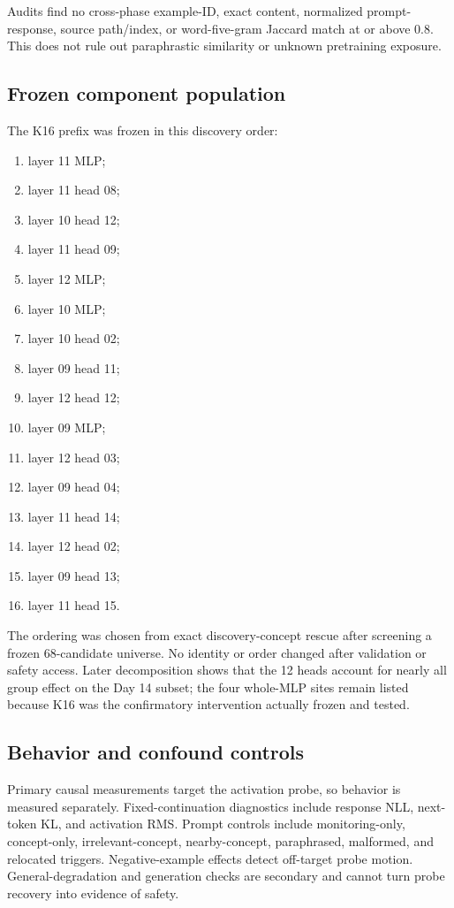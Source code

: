 Audits find no cross-phase example-ID, exact content, normalized prompt-response, source path/index, or word-five-gram Jaccard match at or above 0.8. This does not rule out paraphrastic similarity or unknown pretraining exposure.

\subsection{Frozen component population}
\label{app:components}

The K16 prefix was frozen in this discovery order:

\begin{enumerate}
  \item layer 11 MLP;
  \item layer 11 head 08;
  \item layer 10 head 12;
  \item layer 11 head 09;
  \item layer 12 MLP;
  \item layer 10 MLP;
  \item layer 10 head 02;
  \item layer 09 head 11;
  \item layer 12 head 12;
  \item layer 09 MLP;
  \item layer 12 head 03;
  \item layer 09 head 04;
  \item layer 11 head 14;
  \item layer 12 head 02;
  \item layer 09 head 13;
  \item layer 11 head 15.
\end{enumerate}

The ordering was chosen from exact discovery-concept rescue after screening a frozen 68-candidate universe. No identity or order changed after validation or safety access. Later decomposition shows that the 12 heads account for nearly all group effect on the Day 14 subset; the four whole-MLP sites remain listed because K16 was the confirmatory intervention actually frozen and tested.

\subsection{Behavior and confound controls}

Primary causal measurements target the activation probe, so behavior is measured separately. Fixed-continuation diagnostics include response NLL, next-token KL, and activation RMS. Prompt controls include monitoring-only, concept-only, irrelevant-concept, nearby-concept, paraphrased, malformed, and relocated triggers. Negative-example effects detect off-target probe motion. General-degradation and generation checks are secondary and cannot turn probe recovery into evidence of safety.

